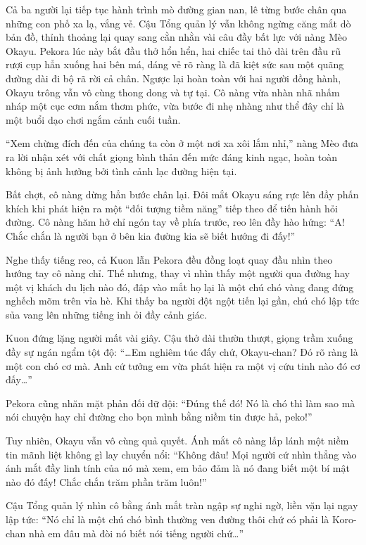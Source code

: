 \documentclass[../main.tex]{subfiles}
\begin{document}
Cả ba người lại tiếp tục hành trình mò đường gian nan, lê từng bước chân qua những con phố xa lạ, vắng vẻ. Cậu Tổng quản lý vẫn không ngừng căng mắt dò bản đồ, thỉnh thoảng lại quay sang cằn nhằn vài câu đầy bất lực với nàng Mèo Okayu. Pekora lúc này bắt đầu thở hổn hển, hai chiếc tai thỏ dài trên đầu rũ rượi cụp hẳn xuống hai bên má, dáng vẻ rõ ràng là đã kiệt sức sau một quãng đường dài đi bộ rã rời cả chân. Ngược lại hoàn toàn với hai người đồng hành, Okayu trông vẫn vô cùng thong dong và tự tại. Cô nàng vừa nhàn nhã nhấm nháp một cục cơm nắm thơm phức, vừa bước đi nhẹ nhàng như thể đây chỉ là một buổi dạo chơi ngắm cảnh cuối tuần.

``Xem chừng đích đến của chúng ta còn ở một nơi xa xôi lắm nhỉ,'' nàng Mèo đưa ra lời nhận xét với chất giọng bình thản đến mức đáng kinh ngạc, hoàn toàn không bị ảnh hưởng bởi tình cảnh lạc đường hiện tại.

Bất chợt, cô nàng dừng hẳn bước chân lại. Đôi mắt Okayu sáng rực lên đầy phấn khích khi phát hiện ra một ``đối tượng tiềm năng'' tiếp theo để tiến hành hỏi đường. Cô nàng hăm hở chỉ ngón tay về phía trước, reo lên đầy hào hứng: ``A! Chắc chắn là người bạn ở bên kia đường kia sẽ biết hướng đi đấy!''

Nghe thấy tiếng reo, cả Kuon lẫn Pekora đều đồng loạt quay đầu nhìn theo hướng tay cô nàng chỉ. Thế nhưng, thay vì nhìn thấy một người qua đường hay một vị khách du lịch nào đó, đập vào mắt họ lại là một chú chó vàng đang đứng nghếch mõm trên vỉa hè. Khi thấy ba người đột ngột tiến lại gần, chú chó lập tức sủa vang lên những tiếng inh ỏi đầy cảnh giác.


Kuon đứng lặng người mất vài giây. Cậu thở dài thườn thượt, giọng trầm xuống đầy sự ngán ngẩm tột độ: ``\dots Em nghiêm túc đấy chứ, Okayu-chan? Đó rõ ràng là một con chó cơ mà. Anh cứ tưởng em vừa phát hiện ra một vị cứu tinh nào đó cơ đấy\dots''

Pekora cũng nhăn mặt phản đối dữ dội: ``Đúng thế đó! Nó là chó thì làm sao mà nói chuyện hay chỉ đường cho bọn mình bằng niềm tin được hả, peko!''

Tuy nhiên, Okayu vẫn vô cùng quả quyết. Ánh mắt cô nàng lấp lánh một niềm tin mãnh liệt không gì lay chuyển nổi: ``Không đâu! Mọi người cứ nhìn thẳng vào ánh mắt đầy linh tính của nó mà xem, em bảo đảm là nó đang biết một bí mật nào đó đấy! Chắc chắn trăm phần trăm luôn!''

Cậu Tổng quản lý nhìn cô bằng ánh mắt tràn ngập sự nghi ngờ, liền vặn lại ngay lập tức: ``Nó chỉ là một chú chó bình thường ven đường thôi chứ có phải là Koro-chan nhà em đâu mà đòi nó biết nói tiếng người chứ\dots''
\end{document}
